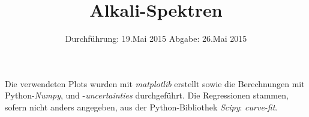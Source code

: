 
\subject{Anfängerpraktikum V605}
\title{Alkali-Spektren}
\date{
  Durchführung: 19.Mai 2015
  \hspace{3em}
  Abgabe: 26.Mai 2015
}


\maketitle
\newpage




%
%
%

\printbibliography
\noindent Die verwendeten Plots wurden mit \textit{matplotlib}\cite{matplotlib} erstellt sowie die Berechnungen mit Python-\textit{Numpy}\cite{numpy}, und -\textit{uncertainties}\cite{uncertainties} durchgeführt.
Die Regressionen stammen, sofern nicht anders angegeben, aus der Python-Bibliothek \textit{Scipy}\cite{scipy}: \emph{curve-fit}.

